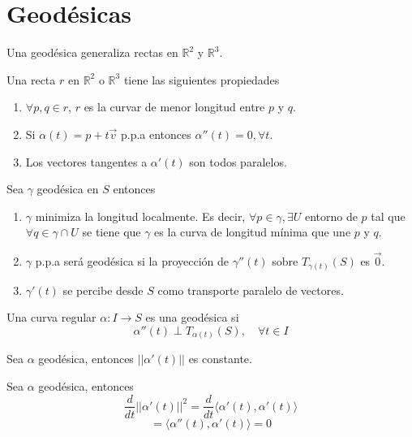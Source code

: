 \section{Geodésicas}

\begin{obs}
  Una geodésica generaliza rectas en $\mathbb{R}^{2}$ y $\mathbb{R}^{3}$.
\end{obs}

\begin{obs}[Rectas]
  Una recta $r$ en $\mathbb{R}^{2}$ o $\mathbb{R}^{3}$ tiene las siguientes propiedades
  \begin{enumerate}[label=(\roman*)]
    \item $\forall p, q \in r$, $r$ es la curvar de menor longitud entre $p$ y $q$.
    \item Si $\alpha(t) = p + t \vec{v}$ p.p.a entonces $\alpha''(t) = 0, \forall t$.
    \item Los vectores tangentes a $\alpha'(t)$ son todos paralelos.
  \end{enumerate}
\end{obs}

\begin{obs}
  Sea $\gamma$ geodésica en $S$ entonces
  \begin{enumerate}[label=(\roman*)]
    \item $\gamma$ minimiza la longitud localmente. Es decir, $\forall p \in \gamma, \exists U $ entorno de $p$ tal que $\forall q \in \gamma \cap U$ se tiene que $\gamma$ es la curva de longitud mínima que une $p$ y $q$.
    \item $\gamma$ p.p.a será geodésica si la proyección  de $\gamma''(t)$ sobre $T_{\gamma(t)}(S)$ es $\vec{0}$.
    \item $\gamma'(t)$ se percibe desde $S$ como transporte paralelo de vectores.
  \end{enumerate}
\end{obs}

\begin{defn}[Geodésica]
  Una curva regular $\alpha : I \to S$ es una geodésica si 
  \[ 
    \alpha''(t) \perp T_{\alpha(t)}(S), \quad \forall t \in I
  \] 
\end{defn}

\begin{lem}
  Sea $\alpha$ geodésica, entonces $||\alpha'(t)||$ es constante.
\end{lem}

\begin{dem}
  Sea $\alpha$ geodésica, entonces
  \[ 
    \frac{d{}}{d{t}}|| \alpha'(t) ||^{2} = \frac{d{}}{d{t}} \langle \alpha'(t){ , }\alpha'(t) \rangle
  \] 
  \[ 
    = \langle \alpha''(t){ , }\alpha'(t) \rangle  = 0
  \] 
\end{dem}

